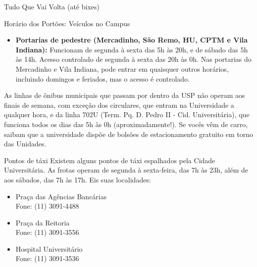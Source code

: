 \begin{secao}{Tudo Que Vai Volta (até bixes)}
\begin{subsecao}{Horário dos Portões: Veículos no Campus}
\begin{itemize}
  \item {\bf Portarias de pedestre (Mercadinho, São Remo, HU, CPTM e
  	Vila Indiana):} Funcionam de segunda à sexta das 5h às 20h, e de sábado
	das 5h às 14h. Acesso controlado de segunda à sexta das 20h às 0h.
	Nas portarias do Mercadinho e Vila Indiana, pode entrar em quaisquer
	outros horários, incluindo domingos e feriados, mas o acesso é controlado.

\end{itemize}

As linhas de ônibus municipais que passam por dentro da USP não operam aos
finais de semana, com exceção dos circulares, que entram na Universidade a
qualquer hora, e da linha 702U (Term. Pq. D. Pedro II - Cid. Universitária), que
funciona todos os dias das 5h às 0h (aproximadamente!). Se vocês vêm de carro,
saibam que a universidade dispõe de bolsões de estacionamento gratuito em torno
das Unidades.

\end{subsecao}
\pagebreak
\begin{subsecao}{Pontos de táxi}
Existem alguns pontos de táxi espalhados pela Cidade Universitária. As frotas
operam de segunda à sexta-feira, das 7h às 23h, além de aos sábados, das 7h às
17h. Eis suas localidades:

\begin{itemize}
\item Praça das Agências Bancárias\\
Fone: (11) 3091-4488

\item Praça da Reitoria\\
Fone: (11) 3091-3556

\item Hospital Universitário\\
Fone: (11) 3091-3536
\end{itemize}
\end{subsecao}

\end{secao}
